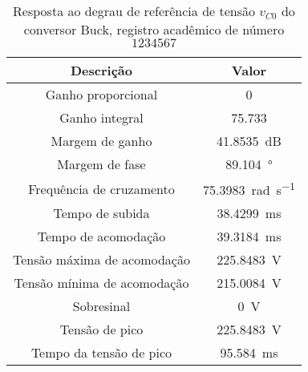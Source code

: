 \begin{table}[!ht]
\centering
\caption{Resposta ao degrau de referência de tensão $v_{C0}$ do conversor Buck, registro acadêmico de número $1234567$}
\label{tab:resposta1malha}
\begin{tabular}{@{}cc@{}}
\toprule
\textbf{Descrição} & \textbf{Valor}\\ \midrule
Ganho proporcional & \SI{0}{}\\
Ganho integral & \SI{75.733}{}\\
Margem de ganho & \SI{41.8535}{\deci\bel}\\
Margem de fase & \SI{89.104}{\degree}\\
Frequência de cruzamento & \SI{75.3983}{\radian\per\s}\\
Tempo de subida & \SI{38.4299}{\milli\s}\\
Tempo de acomodação & \SI{39.3184}{\milli\s}\\
Tensão máxima de acomodação & \SI{225.8483}{\V}\\
Tensão mínima de acomodação & \SI{215.0084}{\V}\\
Sobresinal & \SI{0}{\V}\\
Tensão de pico & \SI{225.8483}{\V}\\
Tempo da tensão de pico & \SI{95.584}{\milli\s}\\
\bottomrule
\end{tabular}
\end{table}

